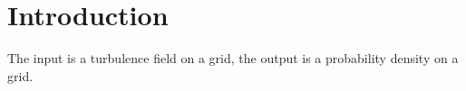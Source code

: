 \section{Introduction}
\label{sec:introduction}

The input is a turbulence field on a grid, the output is a probability density on a grid.